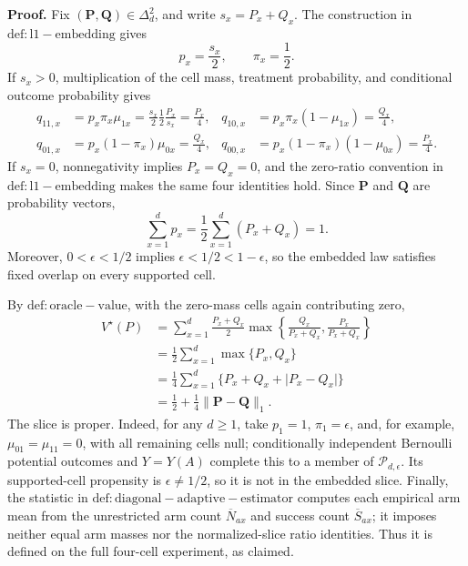 \textbf{Proof.}
Fix \((\mathbf P,\mathbf Q)\in\Delta_d^2\), and write \(s_x=P_x+Q_x\).  The construction in \(\mathrm{def:l1-embedding}\) gives
\[
 p_x=\frac{s_x}{2},\qquad \pi_x=\frac12.
\]
If \(s_x>0\), multiplication of the cell mass, treatment probability, and conditional outcome probability gives
\[
 \begin{aligned}
 q_{11,x}&=p_x\pi_x\mu_{1x}
 =\frac{s_x}{2}\frac12\frac{P_x}{s_x}=\frac{P_x}{4},
 &q_{10,x}&=p_x\pi_x(1-\mu_{1x})=\frac{Q_x}{4},\\
 q_{01,x}&=p_x(1-\pi_x)\mu_{0x}=\frac{Q_x}{4},
 &q_{00,x}&=p_x(1-\pi_x)(1-\mu_{0x})=\frac{P_x}{4}.
 \end{aligned}
\]
If \(s_x=0\), nonnegativity implies \(P_x=Q_x=0\), and the zero-ratio convention in \(\mathrm{def:l1-embedding}\) makes the same four identities hold.  Since \(\mathbf P\) and \(\mathbf Q\) are probability vectors,
\[
 \sum_{x=1}^d p_x
 =\frac12\sum_{x=1}^d(P_x+Q_x)=1.
\]
Moreover, \(0<\epsilon<1/2\) implies \(\epsilon<1/2<1-\epsilon\), so the embedded law satisfies fixed overlap on every supported cell.

By \(\mathrm{def:oracle-value}\), with the zero-mass cells again contributing zero,
\[
 \begin{aligned}
 V^\star(P)
 &=\sum_{x=1}^d \frac{P_x+Q_x}{2}
   \max\!\left\{\frac{Q_x}{P_x+Q_x},
                    \frac{P_x}{P_x+Q_x}\right\}\\
 &=\frac12\sum_{x=1}^d\max\{P_x,Q_x\}\\
 &=\frac14\sum_{x=1}^d
   \{P_x+Q_x+\lvert P_x-Q_x\rvert\}\\
 &=\frac12+\frac14\lVert\mathbf P-\mathbf Q\rVert_1.
 \end{aligned}
\]
The slice is proper.  Indeed, for any \(d\ge1\), take \(p_1=1\), \(\pi_1=\epsilon\), and, for example, \(\mu_{01}=\mu_{11}=0\), with all remaining cells null; conditionally independent Bernoulli potential outcomes and \(Y=Y(A)\) complete this to a member of \(\mathcal P_{d,\epsilon}\).  Its supported-cell propensity is \(\epsilon\ne1/2\), so it is not in the embedded slice.  Finally, the statistic in \(\mathrm{def:diagonal-adaptive-estimator}\) computes each empirical arm mean from the unrestricted arm count \(\overline N_{ax}\) and success count \(\overline S_{ax}\); it imposes neither equal arm masses nor the normalized-slice ratio identities.  Thus it is defined on the full four-cell experiment, as claimed.
